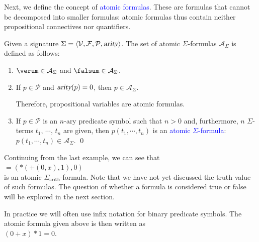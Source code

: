 Next, we define the concept of \textcolor{blue}{atomic formulas}. These are formulas
that cannot be decomposed into smaller formulas: atomic formulas thus contain neither propositional connectives
nor quantifiers. 
\begin{Definition}
  Given a signature $\Sigma = \langle \mathcal{V}, \mathcal{F}, \mathcal{P}, \textsl{arity} \rangle$. 
  The set of atomic $\Sigma$-formulas $\mathcal{A}_\Sigma$ 
  is defined as follows:
  \begin{enumerate}
  \item $\verum \in \mathcal{A}_\Sigma$ and  $\falsum \in \mathcal{A}_\Sigma$.
  \item If $p \in \mathcal{P}$ and $\textsl{arity}(p)= 0$, then $p \in \mathcal{A}_\Sigma$.

        Therefore, propositional variables are atomic formulas.
  \item If $p \in \mathcal{P}$ is an $n$-ary predicate symbol such that $n > 0$ and, furthermore,  $n$ $\Sigma$-terms
        $t_1$, $\cdots$, $t_n$ are given, then  $p(t_1,\cdots,t_n)$ is an \textcolor{blue}{atomic $\Sigma$-formula}: \\[0.2cm]
        \hspace*{1.3cm} $p(t_1,\cdots,t_n) \in \mathcal{A}_\Sigma$.  \qed
  \end{enumerate}
\end{Definition}

\exampleEng
Continuing from the last example, we can see that \\[0.2cm]
\hspace*{1.3cm} $\mathtt{=}(*(\mathtt{+}(0,x),1),0)$ \\[0.2cm]
is an atomic $\Sigma_\mathrm{arith}$-formula. Note that we have not yet discussed the truth value of such
formulas. The question of whether a formula is considered true or false
will be explored in the next section.

In practice we will often use infix notation for binary predicate symbols.  The atomic formula given above is then
written as
\\[0.2cm]
\hspace*{1.3cm}
$(0 + x) * 1 = 0$.
\eox


